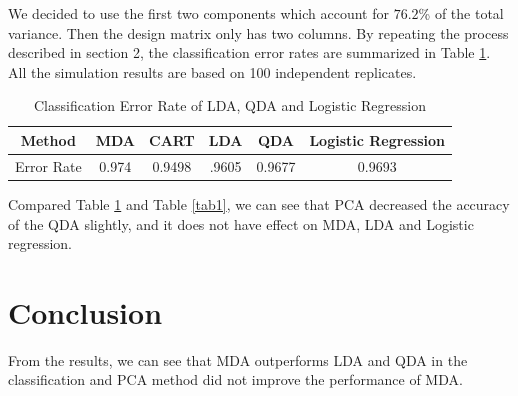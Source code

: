 \documentclass[12pt]{article}
\begin{document}
We decided to use the first two components which account for $76.2$\% of the total variance. Then the design matrix only has two columns. By repeating the process described in section 2, the classification error rates are summarized in Table \ref{tab3}. All the simulation results are based on 100 independent replicates.
\begin{table}[htbp]
	\begin{center}
		\caption{\label{tab3} Classification Error Rate of LDA, QDA and Logistic Regression}
		\begin{tabular}{c|ccccc}
			\hline
			Method&MDA &CART&LDA &QDA &Logistic Regression \\
			\hline
			Error Rate&0.974&0.9498&.9605&0.9677&0.9693  \\
			\hline
		\end{tabular}
	\end{center}
\end{table}
Compared Table \ref{tab3} and Table \ref{tab1}, we can see that PCA decreased the accuracy of the QDA slightly, and it does not have effect on MDA, LDA and Logistic regression.

\section{Conclusion}
From the results, we can see that MDA outperforms LDA and QDA in the classification and PCA method did not improve the performance of MDA.
\end{document}
